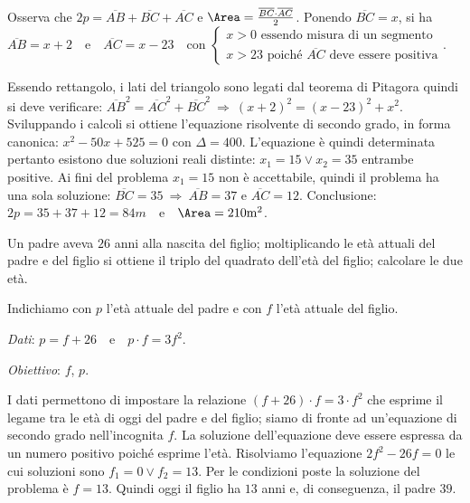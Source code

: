 \begin{soluzione}

Osserva che $2p = \overline {AB} + \overline {BC} + \overline {AC}$ e $\Area =\frac{\overline {BC} \cdot \overline {AC}}{2}$.
Ponendo $\overline {BC} = x$, si ha $\overline {AB} = x + 2$~~e~~$\overline{AC} = x - 23$~~con
$\left\{\begin{array}{l} x > 0 \text{ essendo misura di un segmento} \\x >23 \text{ poiché } \overline {AC} \text{ deve essere positiva}
\end{array}\right.$.

Essendo rettangolo, i lati del triangolo sono legati dal teorema di Pitagora
quindi si deve verificare: $\overline {AB}^{2}= \overline {AC}^{2} + \overline {BC}^{2}\:\Rightarrow\: ( x + 2 )^{2} = ( x - 23 )^{2} + x^{2}$. Sviluppando i calcoli si ottiene l'equazione risolvente di secondo grado, in forma canonica: $x^{2} - 50 x + 525 = 0$ con $\Delta = 400$. L'equazione è quindi determinata pertanto esistono due soluzioni reali distinte: $x_{1} = 15 \vee x_{2} = 35$ entrambe positive. Ai fini del problema $x_{1} = 15$ non è accettabile, quindi il problema ha una sola soluzione: $\overline {BC} = 35 \:\Rightarrow\: \overline {AB} = 37$ e $\overline {AC} = 12$. Conclusione: $2p = 35 + 37 + 12 = 84\unit{m}$~~e~~$\Area = 210\unit{m^{2}}$.
\end{soluzione}

\begin{problema}
Un padre aveva $26$ anni alla nascita del figlio; moltiplicando le età attuali del padre e del figlio si ottiene il triplo del quadrato dell'età del figlio; calcolare le due età.
\end{problema}

Indichiamo con $p$ l'età attuale del padre e con $f$ l'età attuale del figlio.

\emph{Dati}: $p = f + 26$~~e~~$p \cdot f = 3 f^{2}$.

\emph{Obiettivo}: $f$, $p$.

\begin{soluzione}
I dati permettono di impostare la relazione $(f + 26) \cdot f = 3 \cdot f^{2}$ che esprime il legame tra le età di oggi del padre e del figlio; siamo di
fronte ad un'equazione di secondo grado nell'incognita $f$. La soluzione dell'equazione deve essere espressa da un numero positivo poiché esprime l'età.
Risolviamo l'equazione $2 f^{2} - 26 f = 0$ le cui soluzioni sono $f_{1} = 0 \vee f_{2} = 13$. Per le condizioni poste la soluzione del problema è
$f = 13$. Quindi oggi il figlio ha $13$ anni e, di conseguenza, il padre $39$.
\end{soluzione}

